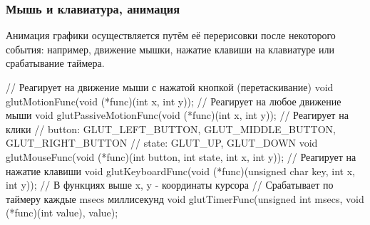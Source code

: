\begin{frame}[fragile]
	\frametitle{Мышь и клавиатура, анимация}
	Анимация графики осуществляется путём её перерисовки после некоторого события:
	например, движение мышки, нажатие клавиши на клавиатуре или срабатывание
	таймера. 
	\begin{small}
	\begin{code}
// Реагирует на движение мыши с нажатой кнопкой (перетаскивание)
void glutMotionFunc(void (*func)(int x, int y));
// Реагирует на любое движение мыши
void glutPassiveMotionFunc(void (*func)(int x, int y));
// Реагирует на клики
// button: GLUT_LEFT_BUTTON, GLUT_MIDDLE_BUTTON, GLUT_RIGHT_BUTTON
// state:  GLUT_UP, GLUT_DOWN
void glutMouseFunc(void (*func)(int button, int state, int x, int y));
// Реагирует на нажатие клавиши
void glutKeyboardFunc(void (*func)(unsigned char key, int x, int y));
// В функциях выше x, y - координаты курсора
// Срабатывает по таймеру каждые msecs миллисекунд
void glutTimerFunc(unsigned int msecs, void (*func)(int value), value);
	\end{code}
	\end{small}
\end{frame}


